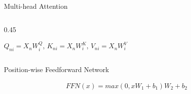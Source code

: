 \documentclass[aspectratio=169,xcolor=dvipsnames,svgnames,x11names,fleqn]{beamer}
\begin{document}
\begin{frame}{Multi-head Attention}
\begin{columns}[T]
\begin{column}{0.45\textwidth}
{
}

$Q_{ni} = X_n W_i^Q$, $K_{ni} = X_n W_i^K$, $V_{ni} = X_n W_i^V$


    \end{column}
\end{columns}

\end{frame}


\begin{frame}{Position-wise Feedforward Network}

\Large

\begin{align*}
FFN(x)  = max(0, xW_1 + b_1)W_2 + b_2
\end{align*}

\end{frame}
\end{document}
